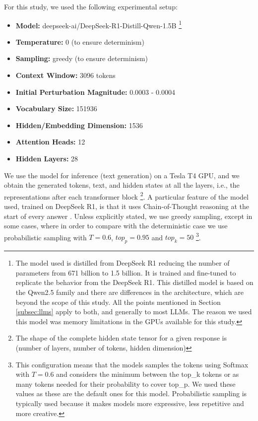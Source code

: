 \documentclass[a4paper,12pt]{article}
\begin{document}
For this study, we used the following experimental setup:
\begin{itemize}
    \item \textbf{Model:} deepseek-ai/DeepSeek-R1-Distill-Qwen-1.5B \cite{deepseek2025r1distillqwen1.5b} \footnote{The model used is distilled from DeepSeek R1 reducing the number of parameters from 671 billion to 1.5 billion. It is trained and fine-tuned to replicate the behavior from the DeepSeek R1. This distilled model is based on the Qwen2.5 family and there are differences in the architecture, which are beyond the scope of this study. All the points mentioned in Section \ref{subsec:llms} apply to both, and generally to most LLMs. The reason we used this model was memory limitations in the GPUs available for this study.}
    \item \textbf{Temperature:} 0 (to ensure determinism)
    \item \textbf{Sampling:} greedy (to ensure determinism)
    \item \textbf{Context Window:} 3096 tokens
    \item \textbf{Initial Perturbation Magnitude:} 0.0003 - 0.0004 %
    \item \textbf{Vocabulary Size:} 151936
    \item \textbf{Hidden/Embedding Dimension:} 1536
    \item \textbf{Attention Heads:} 12
    \item \textbf{Hidden Layers:} 28
\end{itemize}

We use the model for inference (text generation) on a Tesla T4 GPU, and we obtain the generated tokens, text, and hidden states at all the layers, i.e., the representations after each transformer block \footnote{The shape of the complete hidden state tensor for a given response is (number of layers, number of tokens, hidden dimension)}. A particular feature of the model used, trained on DeepSeek R1, is that it uses Chain-of-Thought reasoning at the start of every answer \cite{deepseekR1}. Unless explicitly stated, we use greedy sampling, except in some cases, where in order to compare with the deterministic case we use probabilistic sampling with $T=0.6$, $top_p = 0.95$ and $top_k = 50$ \footnote{This configuration means that the models samples the tokens using Softmax with $T=0.6$ and considers the minimum between the top_k tokens or as many tokens needed for their probability to cover top_p. We used these values as these are the default ones for this model. Probabilistic sampling is typically used because it makes models more expressive, less repetitive and more creative.}.
\end{document}
